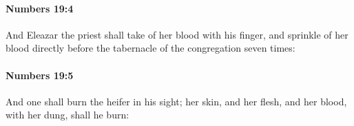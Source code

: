 		\paragraph{Numbers 19:4} %
			\label{NUMBERS-19-4}

			And Eleazar the priest shall take of her blood with his finger, and sprinkle of her blood directly before the tabernacle of the congregation seven times:


		\paragraph{Numbers 19:5} %
			\label{NUMBERS-19-5}

			And one shall burn the heifer in his sight; her skin, and her flesh, and her blood, with her dung, shall he burn:


